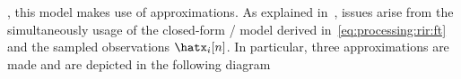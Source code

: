 , this model makes use of approximations.
As explained in~, issues arise from the simultaneously usage of the closed-form \RIR/ model derived in~\cref{eq:processing:rir:ft}
and the sampled observations $\hatx_i[n]$. In particular, three approximations are made and are depicted in the following diagram

\begin{figure}[!h]
    \begin{fullwidthfig}
    \centering


    \begin{tikzpicture}[x=0.75pt,y=0.75pt,yscale=-1,xscale=1]


\end{tikzpicture}
\end{fullwidthfig}
\end{figure}
